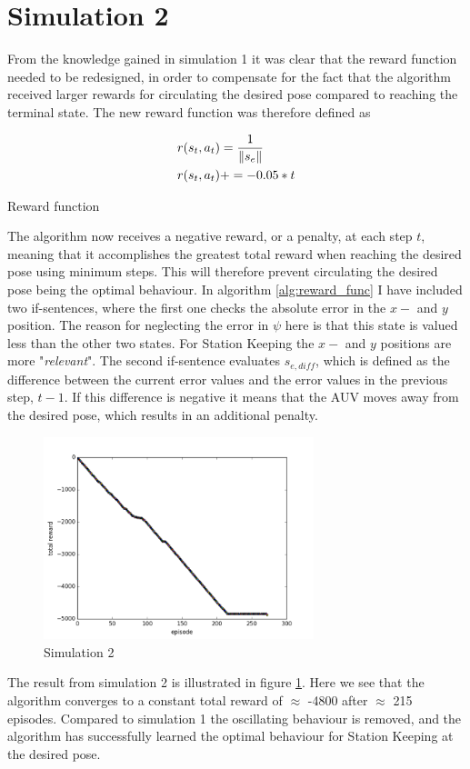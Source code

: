 \section{Simulation 2}
From the knowledge gained in simulation 1 it was clear that the reward function needed to be redesigned, in order to compensate for the fact that the algorithm received larger rewards for circulating the desired pose compared to reaching the terminal state. The new reward function was therefore defined as

\begin{algorithm}[H]
\SetAlgoLined
\begin{align}
    r(s_{t}, a_{t}) & = \frac{1}{\left\lVert s_{e}\right\rVert} \\
    r(s_{t}, a_{t}) & += -0.05*t
\end{align}
\caption{Reward function}
\label{alg:reward_func}
\end{algorithm}
The algorithm now receives a negative reward, or a penalty, at each step $t$, meaning that it accomplishes the greatest total reward when reaching the desired pose using minimum steps. This will therefore prevent circulating the desired pose being the optimal behaviour. In algorithm \ref{alg:reward_func} I have included two if-sentences, where the first one checks the absolute error in the $x-$ and $y$ position. The reason for neglecting the error in $\psi$ here is that this state is valued less than the other two states. For Station Keeping the $x-$ and $y$ positions are more "\textit{relevant}". The second if-sentence evaluates $s_{e,diff}$, which is defined as the difference between the current error values and the error values in the previous step, $t-1$. If this difference is negative it means that the AUV moves away from the desired pose, which results in an additional penalty. 
\begin{figure}[H]
    \centering
    \includegraphics[width=0.7\textwidth]{images/chap5/figure_1-1.png}
    \caption{Simulation 2}
    \label{fig:sim2}
\end{figure}
The result from simulation 2 is illustrated in figure \ref{fig:sim2}. Here we see that the algorithm converges to a constant total reward of $\approx$ -4800 after $\approx$ 215 episodes. Compared to simulation 1 the oscillating behaviour is removed, and the algorithm has successfully learned the optimal behaviour for Station Keeping at the desired pose. 
